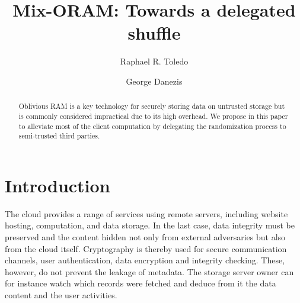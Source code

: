 \documentclass{llncs}
\begin{document}
\title{Mix-ORAM: Towards a delegated shuffle}
%
%
\author{Raphael R. Toledo \and George Danezis}
%
%
%

\maketitle              %

\begin{abstract}
Oblivious RAM is a key technology for securely storing data on untrusted storage but is commonly considered impractical due to its high overhead. We propose in this paper to  alleviate most of the client computation by delegating the randomization process to semi-trusted third parties.
\end{abstract}
%
\section{Introduction}\label{Introduction}
%
The cloud provides a range of services using remote servers, including website hosting, computation, and data storage. In the last case, data integrity must be preserved and the content hidden not only from external adversaries but also from the cloud itself.
Cryptography is thereby used for secure communication channels, user authentication, data encryption and integrity checking.
These, however, do not prevent the leakage of metadata. The storage server owner can for instance watch which records were fetched and deduce from it the data content and the user activities. 
\end{document}
